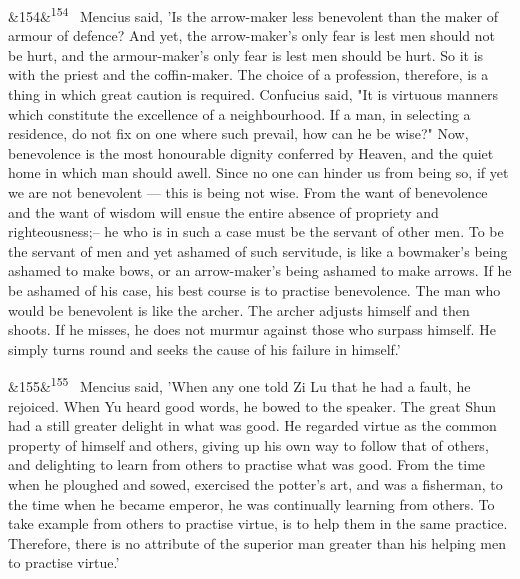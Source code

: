 \documentclass[12pt]{article}
\newcommand{\para}[1][]{\par\noindent\ifx&#1&\else\textsuperscript{\footnotesize #1}~\fi}
\begin{document}
\para[154] Mencius said, 'Is the arrow-maker less benevolent than the maker of armour of defence? And yet, the arrow-maker's only fear is lest men should not be hurt, and the armour-maker's only fear is lest men should be hurt. So it is with the priest and the coffin-maker. The choice of a profession, therefore, is a thing in which great caution is required. Confucius said, "It is virtuous manners which constitute the excellence of a neighbourhood. If a man, in selecting a residence, do not fix on one where such prevail, how can he be wise?" Now, benevolence is the most honourable dignity conferred by Heaven, and the quiet home in which man should awell. Since no one can hinder us from being so, if yet we are not benevolent --- this is being not wise. From the want of benevolence and the want of wisdom will ensue the entire absence of propriety and righteousness;-- he who is in such a case must be the servant of other men. To be the servant of men and yet ashamed of such servitude, is like a bowmaker's being ashamed to make bows, or an arrow-maker's being ashamed to make arrows. If he be ashamed of his case, his best course is to practise benevolence. The man who would be benevolent is like the archer. The archer adjusts himself and then shoots. If he misses, he does not murmur against those who surpass himself. He simply turns round and seeks the cause of his failure in himself.'

\para[155] Mencius said, 'When any one told Zi Lu that he had a fault, he rejoiced. When Yu heard good words, he bowed to the speaker. The great Shun had a still greater delight in what was good. He regarded virtue as the common property of himself and others, giving up his own way to follow that of others, and delighting to learn from others to practise what was good. From the time when he ploughed and sowed, exercised the potter's art, and was a fisherman, to the time when he became emperor, he was continually learning from others. To take example from others to practise virtue, is to help them in the same practice. Therefore, there is no attribute of the superior man greater than his helping men to practise virtue.'
\end{document}
